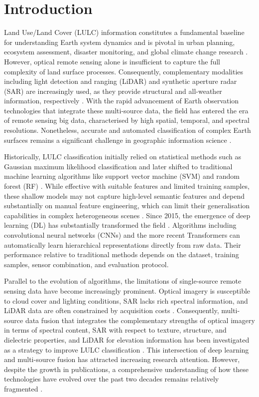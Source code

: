 \documentclass[]{interact}
\theoremstyle{plain}%
\theoremstyle{definition}
\theoremstyle{remark}
\begin{document}
\section{Introduction}

Land Use/Land Cover (LULC) information constitutes a fundamental baseline for understanding Earth system dynamics and is pivotal in urban planning, ecosystem assessment, disaster monitoring, and global climate change research \citep{1}. However, optical remote sensing alone is insufficient to capture the full complexity of land surface processes. Consequently, complementary modalities including light detection and ranging (LiDAR) and synthetic aperture radar (SAR) are increasingly used, as they provide structural and all-weather information, respectively \citep{6}. With the rapid advancement of Earth observation technologies that integrate these multi-source data, the field has entered the era of remote sensing big data, characterised by high spatial, temporal, and spectral resolutions. Nonetheless, accurate and automated classification of complex Earth surfaces remains a significant challenge in geographic information science \citep{56}.


Historically, LULC classification initially relied on statistical methods such as Gaussian maximum likelihood classification and later shifted to traditional machine learning algorithms like support vector machine (SVM) and random forest (RF) \citep{belgiu2016random}. While effective with suitable features and limited training samples, these shallow models may not capture high-level semantic features and depend substantially on manual feature engineering, which can limit their generalisation capabilities in complex heterogeneous scenes \citep{56}. Since 2015, the emergence of deep learning (DL) has substantially transformed the field \citep{2}. Algorithms including convolutional neural networks (CNNs) and the more recent Transformers can automatically learn hierarchical representations directly from raw data. Their performance relative to traditional methods depends on the dataset, training samples, sensor combination, and evaluation protocol.


Parallel to the evolution of algorithms, the limitations of single-source remote sensing data have become increasingly prominent. Optical imagery is susceptible to cloud cover and lighting conditions, SAR lacks rich spectral information, and LiDAR data are often constrained by acquisition costs \citep{6}. Consequently, multi-source data fusion that integrates the complementary strengths of optical imagery in terms of spectral content, SAR with respect to texture, structure, and dielectric properties, and LiDAR for elevation information has been investigated as a strategy to improve LULC classification \citep{hong2021benchmarks}. This intersection of deep learning and multi-source fusion has attracted increasing research attention. However, despite the growth in publications, a comprehensive understanding of how these technologies have evolved over the past two decades remains relatively fragmented \citep{5}.
\end{document}
